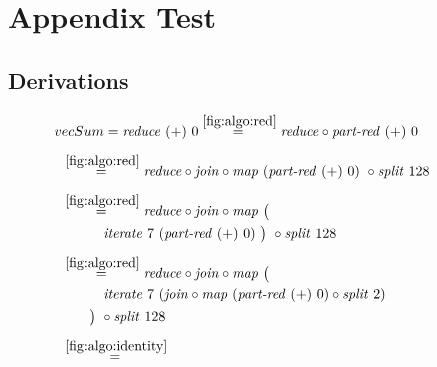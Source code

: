 
\chapter{Appendix Test}


\section{Derivations}

\begin{figure*}[t]
\begin{align*}
  &\hspace{-1.5em}vecSum = \reduce\ (+)\ 0
%
  \overset{\ref{fig:algo:red}}{=\hspace{.2em}}
      \reduce \circ \partRed\ (+)\ 0\\[.5em]
%
  &\hspace{-2em}\quad\begin{aligned}
    &\overset{\ref{fig:algo:red}}{=\hspace{.2em}}
      \reduce \circ \join \circ \map\ (\partRed\ (+)\ 0)\ \circ \splitN\ 128
  \end{aligned}\\[.5em]
%
  &\hspace{-2em}\quad\begin{aligned}
    &\overset{\ref{fig:algo:red}}{=\hspace{.2em}}
      \reduce \circ \join \circ \map\ \big(\\
    &\qquad\quad\iterateN\ 7\ (\partRed\ (+)\ 0)\ \big)\ \circ \splitN\ 128
  \end{aligned}\\[.5em]
%
  &\hspace{-2em}\quad\begin{aligned}
    &\overset{\ref{fig:algo:red}}{=\hspace{.2em}}
      \reduce \circ \join \circ \map\ \big(\\
    &\qquad\quad\iterateN\ 7\ (\join \circ \map\ (\partRed\ (+)\ 0) \circ \splitN\ 2)\\
    &\qquad\big)\ \circ \splitN\ 128
  \end{aligned}\\[.5em]
%
  &\hspace{-2em}\quad\begin{aligned}
    &\overset{\ref{fig:algo:identity}}{=\hspace{.2em}}

\end{aligned}
\end{align*}
\end{figure*}
